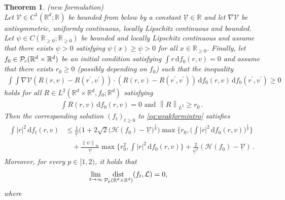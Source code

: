 \documentclass[11pt]{article}
\newtheorem{theorem}{Theorem}[section]
\newcommand{\R}[0]{\mathbb R}
\DeclareMathOperator{\dist}{dist}
\newcommand{\norm}[1]{\left\| #1 \right\|}
\newcommand{\abs}[1]{\left| #1 \right|}
\newcommand{\Pp}[1]{
    \ifx #1\infty
        \mathcal{P}_{c}
    \else 
        \mathcal{P}_{#1}
    \fi 
}
\newcommand{\msolinit}[1]{f_0(#1)}
\newcommand{\msolt}[2]{f_{#1}(#2)}
\begin{document}
\begin{bibunit}[unsrtnat]
\begin{theorem}(new formulation)\label{thm:asymptotics} \\
        Let $\mathcal{V} \in C^{1}(\R^d; \R)$ be bounded from below by a constant $\underline{\mathcal{V}} \in \R$ and let $\nabla \mathcal{V}$ be antisymmetric, uniformly continuous, locally Lipschitz continuous and bounded. Let $\psi \in C(\R_{\geq 0}; \R_{\geq 0})$ be bounded and locally Lipschitz continuous and assume that there exists $\underline{\psi} > 0$ satisfying $\psi(x) \geq \underline{\psi} > 0$ for all $x \in \R_{\geq 0}$. Finally, let $f_0 \in \Pp{\infty}(\R^d \times \R^d)$ be an initial condition satisfying $\int r \, \mathrm{d} f_0(r,v) = 0$ and assume that there exists $r_0 \geq 0$ (possibly depending on $f_0$) such that the inequality 
        \begin{align}
            \int \int \nabla \mathcal{V}(R(r,v)-R(r^\prime,v^\prime)) \cdot (R(r,v)-R(r^\prime,v^\prime)) \, \mathrm{d} \msolinit{r,v} \, \mathrm{d}\msolinit{r^\prime, v^\prime} \geq 0 \label{eq:attrcase} %
        \end{align}
        holds for all $R \in L^2(\R^d \times \R^d, f_0; \R^d)$ satisfying 
        \begin{align*}
            \int R(r,v) \, \mathrm{d}\msolinit{r,v} = 0 \text{ and } \norm{R}_{L^2} \geq r_0 \, .
        \end{align*}
        Then the corresponding solution $(f_t)_{t \geq 0}$ to \eqref{eq:weakformintro} satisfies 
        \begin{align}
            \int \abs{r}^2 \, \mathrm{d}\msolt{t}{r,v}  &\leq \frac{1}{\underline{\psi}} \Big( 1 + 2 \sqrt{2} \big( \mathcal{H}(f_{0}) - \underline{\mathcal{V}} \big)^{\frac{1}{2}} \Big)  \max \Big\{ r_0, \Big( \int  \abs{r}^2 \, \mathrm{d}\msolinit{r,v} \Big)^{\frac{1}{2} } \Big\}  \nonumber \\
            &\quad + \frac{\norm{\psi}_\infty}{\underline{\psi}} \max \Big\{ r_0^{2}, \int \abs{r}^2 \, \mathrm{d}\msolinit{r,v} \Big\}  + \frac{2}{\underline{\psi}^{2}} (\mathcal{H}(f_0) - \underline{\mathcal{V}})   \, . \label{eq:momboundattr}
        \end{align}
        Moreover, for every $p \in [1,2)$, it holds that
        \begin{align}
             \lim_{t\rightarrow \infty} &\dist_{\Pp{p} (\R^d \times \R^d )}(f_t, \mathcal{L}) =0, \label{eq:Wpdistconv}
        \end{align}
        where
        \begin{align*}

\end{align*}
\end{theorem}
\end{bibunit}
\end{document}
